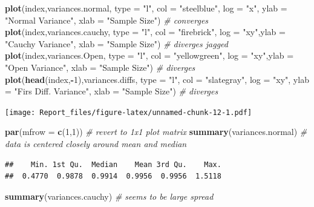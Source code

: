 \documentclass[]{article}
\newenvironment{Shaded}{\begin{snugshade}}{\end{snugshade}}
\newcommand{\CommentTok}[1]{\textcolor[rgb]{0.56,0.35,0.01}{\textit{#1}}}
\newcommand{\DataTypeTok}[1]{\textcolor[rgb]{0.13,0.29,0.53}{#1}}
\newcommand{\DecValTok}[1]{\textcolor[rgb]{0.00,0.00,0.81}{#1}}
\newcommand{\KeywordTok}[1]{\textcolor[rgb]{0.13,0.29,0.53}{\textbf{#1}}}
\newcommand{\NormalTok}[1]{#1}
\newcommand{\OperatorTok}[1]{\textcolor[rgb]{0.81,0.36,0.00}{\textbf{#1}}}
\newcommand{\StringTok}[1]{\textcolor[rgb]{0.31,0.60,0.02}{#1}}
\begin{document}
\begin{Shaded}
\begin{Highlighting}[]
\KeywordTok{plot}\NormalTok{(index,variances.normal, }\DataTypeTok{type =} \StringTok{"l"}\NormalTok{, }\DataTypeTok{col =} \StringTok{"steelblue"}\NormalTok{, }\DataTypeTok{log =} \StringTok{"x"}\NormalTok{, }\DataTypeTok{ylab =} \StringTok{"Normal Variance"}\NormalTok{, }\DataTypeTok{xlab =} \StringTok{"Sample Size"}\NormalTok{) }\CommentTok{# converges}
\KeywordTok{plot}\NormalTok{(index,variances.cauchy, }\DataTypeTok{type =} \StringTok{"l"}\NormalTok{, }\DataTypeTok{col =} \StringTok{"firebrick"}\NormalTok{, }\DataTypeTok{log =} \StringTok{"xy"}\NormalTok{,}\DataTypeTok{ylab =} \StringTok{"Cauchy Variance"}\NormalTok{, }\DataTypeTok{xlab =} \StringTok{"Sample Size"}\NormalTok{) }\CommentTok{# diverges jagged}
\KeywordTok{plot}\NormalTok{(index,variances.Open, }\DataTypeTok{type =} \StringTok{"l"}\NormalTok{, }\DataTypeTok{col =} \StringTok{"yellowgreen"}\NormalTok{, }\DataTypeTok{log =} \StringTok{"xy"}\NormalTok{,}\DataTypeTok{ylab =} \StringTok{"Open Variance"}\NormalTok{, }\DataTypeTok{xlab =} \StringTok{"Sample Size"}\NormalTok{) }\CommentTok{# diverges}
\KeywordTok{plot}\NormalTok{(}\KeywordTok{head}\NormalTok{(index,}\OperatorTok{-}\DecValTok{1}\NormalTok{),variances.diffs, }\DataTypeTok{type =} \StringTok{"l"}\NormalTok{, }\DataTypeTok{col =} \StringTok{"slategray"}\NormalTok{, }\DataTypeTok{log =} \StringTok{"xy"}\NormalTok{, }\DataTypeTok{ylab =} \StringTok{"Firs Diff. Variance"}\NormalTok{, }\DataTypeTok{xlab =} \StringTok{"Sample Size"}\NormalTok{) }\CommentTok{# diverges}
\end{Highlighting}
\end{Shaded}

\texttt{[image: Report\_files/figure-latex/unnamed-chunk-12-1.pdf]}

\begin{Shaded}
\begin{Highlighting}[]
\KeywordTok{par}\NormalTok{(}\DataTypeTok{mfrow =} \KeywordTok{c}\NormalTok{(}\DecValTok{1}\NormalTok{,}\DecValTok{1}\NormalTok{)) }\CommentTok{# revert to 1x1 plot matrix}
\KeywordTok{summary}\NormalTok{(variances.normal) }\CommentTok{# data is centered closely around mean and median}
\end{Highlighting}
\end{Shaded}

\begin{verbatim}
##    Min. 1st Qu.  Median    Mean 3rd Qu.    Max. 
##  0.4770  0.9878  0.9914  0.9956  0.9956  1.5118
\end{verbatim}

\begin{Shaded}
\begin{Highlighting}[]
\KeywordTok{summary}\NormalTok{(variances.cauchy) }\CommentTok{# seems to be large spread}
\end{Highlighting}
\end{Shaded}
\end{document}

